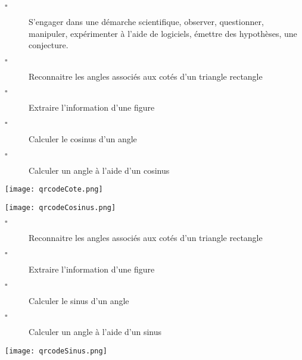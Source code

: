 \documentclass[openany]{book}
\begin{document}
\begin{seance}[Trigonométrie]

\begin{description}
\item[$\square$] S’engager dans une démarche scientifique, observer, questionner, manipuler, expérimenter à l’aide de logiciels, émettre des hypothèses, une conjecture.
\end{description}
\end{seance}



\begin{seance}[Trigonométrie]

\begin{minipage}{0.60\linewidth}
\begin{description}
\item[$\square$] Reconnaitre les angles associés aux cotés d'un triangle rectangle
\item[$\square$] Extraire l'information d'une figure
\item[$\square$] Calculer le cosinus d'un angle
\item[$\square$] Calculer un angle à l'aide d'un cosinus
\end{description}
\end{minipage}
\hfill
\begin{minipage}{0.15\linewidth}
\texttt{[image: qrcodeCote.png]} 
\end{minipage}
\hfill
\begin{minipage}{0.15\linewidth}
\texttt{[image: qrcodeCosinus.png]} 
\end{minipage}

\end{seance}








\begin{seance}[Trigonométrie]

\begin{minipage}{0.68\linewidth}
\begin{description}
\item[$\square$] Reconnaitre les angles associés aux cotés d'un triangle rectangle
\item[$\square$] Extraire l'information d'une figure
\item[$\square$] Calculer le sinus d'un angle
\item[$\square$] Calculer un angle à l'aide d'un sinus
\end{description}

\end{minipage}
\hfill
\begin{minipage}{0.30\linewidth}
\texttt{[image: qrcodeSinus.png]} 
\end{minipage}
\end{seance}
\end{document}
